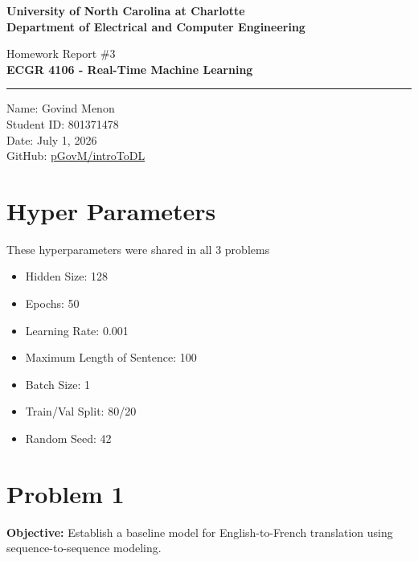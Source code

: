 \documentclass[a4paper]{article}
\begin{document}
\begin{titlepage}
    \thispagestyle{fancy}
    \renewcommand{\headrulewidth}{0pt}
    \begin{center}
        \vspace*{2cm}

        \LARGE\textbf{University of North Carolina at Charlotte\\
                        Department of Electrical and Computer Engineering}
        
        \vspace*{4cm}

        Homework Report $\# 3$ \\
        \Large\textbf{ECGR 4106 - Real-Time Machine Learning} \\
        
        \noindent\rule{14cm}{0.4pt}

        \vspace*{3cm}

        Name: Govind Menon \\
        Student ID: 801371478 \\
        Date: July 1, 2026 \\
        GitHub: \href{https://github.com/pGovm/introToDL.git}{pGovM/introToDL}

    \end{center}
\end{titlepage}

\section{\textbf{\textbf{Hyper Parameters}}}
These hyperparameters were shared in all 3 problems 

\begin{itemize}
    \item Hidden Size: 128
    \item Epochs: 50
    \item Learning Rate: 0.001
    \item Maximum Length of Sentence: 100
    \item Batch Size: 1
    \item Train/Val Split: 80/20
    \item Random Seed: 42
\end{itemize}

\section*{\textbf{Problem 1}}
\textbf{Objective:} Establish a baseline model for English-to-French translation using sequence-to-sequence modeling.
\end{document}
